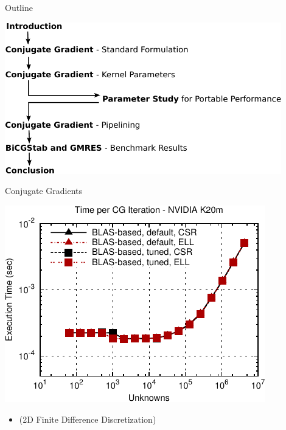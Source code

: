 

\begin{frame}{Outline}
 \begin{center}
  \includegraphics[width=0.9\textwidth]{figures/outline-crop}
 \end{center}
\end{frame}

\begin{frame}[fragile]{Conjugate Gradients}
 \begin{block}{}
 \begin{center}
  \vspace*{-0.5cm}
  \includegraphics[width=0.85\textwidth]{figures/cg-k20m-2}
 \end{center}

 \begin{itemize}
  \item   \vspace*{-0.3cm} {\small (2D Finite Difference Discretization)}
 \end{itemize}
 \end{block}   
\end{frame}

